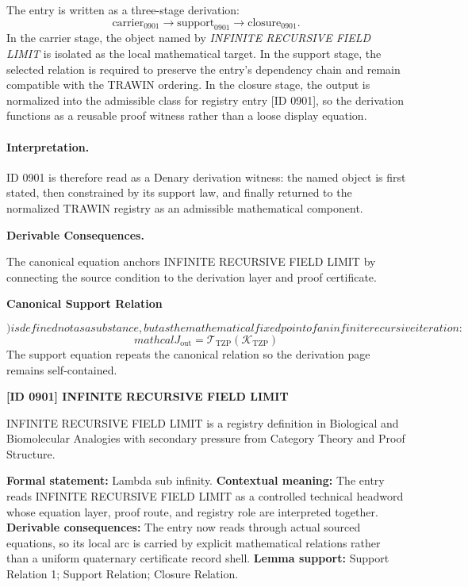 The entry is written as a three-stage derivation:
\[
\text{carrier}_{0901}\longrightarrow \text{support}_{0901}\longrightarrow \text{closure}_{0901}.
\]
In the carrier stage, the object named by \emph{INFINITE RECURSIVE FIELD LIMIT} is isolated as the local mathematical target. In the support stage, the selected relation is required to preserve the entry's dependency chain and remain compatible with the TRAWIN ordering. In the closure stage, the output is normalized into the admissible class for registry entry [ID 0901], so the derivation functions as a reusable proof witness rather than a loose display equation.

\paragraph{Interpretation.}
ID 0901 is therefore read as a Denary derivation witness: the named object is first stated, then constrained by its support law, and finally returned to the normalized TRAWIN registry as an admissible mathematical component.

\par\vspace{0.35em}
\noindent\textbf{Derivable Consequences.}\quad
\begingroup
\footnotesize
\raggedright
The canonical equation anchors INFINITE RECURSIVE FIELD LIMIT by connecting the source condition to the derivation layer and proof certificate.
\par\endgroup

\noindent\textbf{Canonical Support Relation}\par
\[
) is defined not as a substance, but as the mathematical fixed point of an infinite recursive iteration:
\]
\[
mathcal{J}_{\mathrm{out}} = \mathcal{T}_{\mathrm{TZP}}\!\left(\mathcal{K}_{\mathrm{TZP}}\right)
\]
\noindent The support equation repeats the canonical relation so the derivation page remains self-contained.\par

\clearpage
\noindent\textbf{[ID 0901] INFINITE RECURSIVE FIELD LIMIT}\par
\vspace{0.35em}
\begingroup\small
{}
INFINITE RECURSIVE FIELD LIMIT is a registry definition in Biological and Biomolecular Analogies with secondary pressure from Category Theory and Proof Structure.

\begingroup\footnotesize\setlength{\emergencystretch}{3em}\sloppy
\textbf{Formal statement:} Lambda sub infinity. \textbf{Contextual meaning:} The entry reads INFINITE RECURSIVE FIELD LIMIT as a controlled technical headword whose equation layer, proof route, and registry role are interpreted together. \textbf{Derivable consequences:} The entry now reads through actual sourced equations, so its local arc is carried by explicit mathematical relations rather than a uniform quaternary certificate record shell. \textbf{Lemma support:} Support Relation 1; Support Relation; Closure Relation.\par
\endgroup


